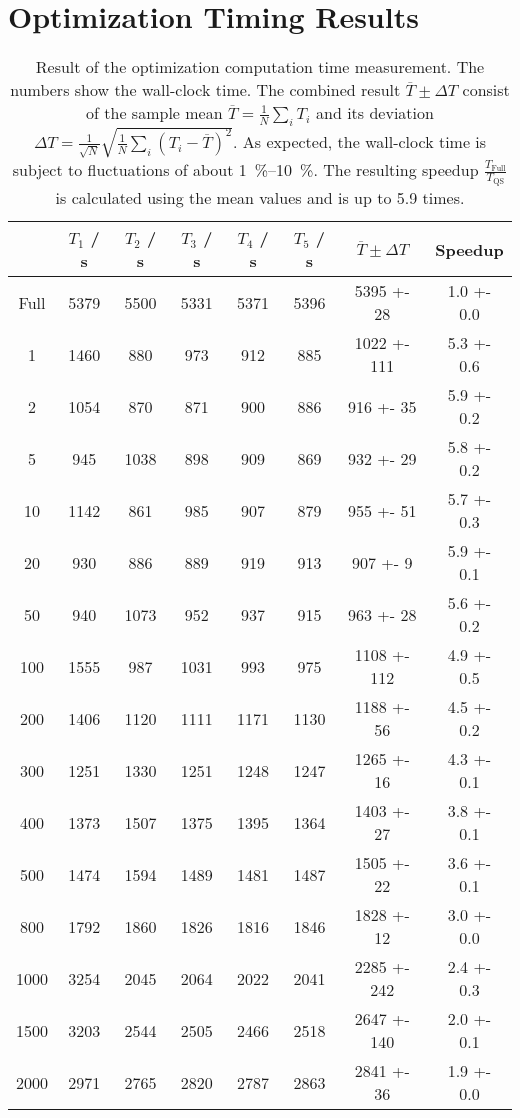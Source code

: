 \section*{Optimization Timing Results}
\begin{table}
	\centering
	\begin{tabular}{ 
			S[table-format=4] 
			S[table-format=4] 
			S[table-format=4] 
			S[table-format=4] 
			S[table-format=4]  
			S[table-format=4] 
			S[table-format=4(3)] 
			S[table-format=1.1(1)]
		}
		\toprule
		\paramregions & {$T_1$ / \si{\second}} &  {$T_2$ / \si{\second}} & {$T_3$ / \si{\second}} & {$T_4$ / \si{\second}} & {$T_5$ / \si{\second}} & {$\overline{T} \pm \Delta T$} & {Speedup} \\
		\midrule
		{Full} & 5379 & 5500 & 5331 & 5371 & 5396 & 5395 +- 28 & 1.0 +- 0.0 \\ 
		 & 1460 & 880 & 973 & 912 & 885 & 1022 +- 111 & 5.3 +- 0.6 \\ 
		2 & 1054 & 870 & 871 & 900 & 886 & 916 +- 35 & 5.9 +- 0.2 \\ 
		5 & 945 & 1038 & 898 & 909 & 869 & 932 +- 29 & 5.8 +- 0.2 \\ 
		10 & 1142 & 861 & 985 & 907 & 879 & 955 +- 51 & 5.7 +- 0.3 \\ 
		20 & 930 & 886 & 889 & 919 & 913 & 907 +- 9 & 5.9 +- 0.1 \\ 
		50 & 940 & 1073 & 952 & 937 & 915 & 963 +- 28 & 5.6 +- 0.2 \\ 
		100 & 1555 & 987 & 1031 & 993 & 975 & 1108 +- 112 & 4.9 +- 0.5 \\ 
		200 & 1406 & 1120 & 1111 & 1171 & 1130 & 1188 +- 56 & 4.5 +- 0.2 \\ 
		300 & 1251 & 1330 & 1251 & 1248 & 1247 & 1265 +- 16 & 4.3 +- 0.1 \\ 
		400 & 1373 & 1507 & 1375 & 1395 & 1364 & 1403 +- 27 & 3.8 +- 0.1 \\ 
		500 & 1474 & 1594 & 1489 & 1481 & 1487 & 1505 +- 22 & 3.6 +- 0.1 \\ 
		800 & 1792 & 1860 & 1826 & 1816 & 1846 & 1828 +- 12 & 3.0 +- 0.0 \\ 
		1000 & 3254 & 2045 & 2064 & 2022 & 2041 & 2285 +- 242 & 2.4 +- 0.3 \\ 
		1500 & 3203 & 2544 & 2505 & 2466 & 2518 & 2647 +- 140 & 2.0 +- 0.1 \\ 
		2000 & 2971 & 2765 & 2820 & 2787 & 2863 & 2841 +- 36 & 1.9 +- 0.0 \\ 
		\bottomrule
	\end{tabular}
	\caption{Result of the optimization computation time measurement. The numbers show the wall-clock time. The combined result $\overline{T} \pm \Delta T$ consist of the sample mean ${\overline{T} = \frac{1}{N} \sum_i T_i}$ and its deviation ${\Delta T = \frac{1}{\sqrt{N}} \sqrt{\frac{1}{N} \sum_i (T_i - \overline{T})^2}}$. As expected, the wall-clock time is subject to fluctuations of about \SIrange{1}{10}{\percent}. The resulting speedup $\frac{T_{\textrm{Full}}}{T_{\textrm{QS}}}$ is calculated using the mean values and is up to 5.9 times.}
	\label{tbl:timing_results}
\end{table}
